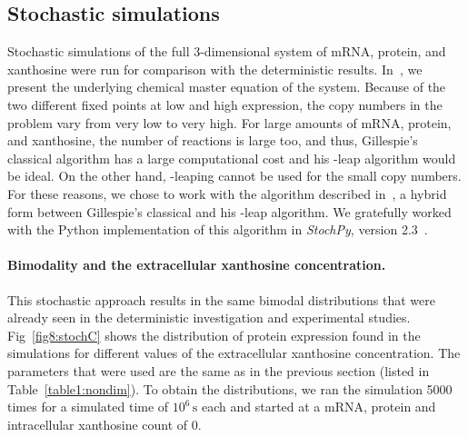 \documentclass[10pt,letterpaper]{article}
\newcommand{\unit}[1]{\,\mathrm{#1}}
\begin{document}
	\subsection*{Stochastic simulations}
	Stochastic simulations of the full 3-dimensional system of mRNA, protein,
	and xanthosine were run for comparison with the deterministic results.
	In~, we present the underlying chemical master equation of
	the system. Because of the two different fixed points at low and high
	expression, the copy numbers in the problem vary from very low to very high.
	For large amounts of mRNA, protein, and xanthosine, the number of reactions
	is large too, and thus, Gillespie's classical algorithm has a large
	computational cost and his \texttau-leap algorithm would be ideal. On the
	other hand, \texttau-leaping cannot be used for the small copy numbers. For
	these reasons, we chose to work with the algorithm described
	in~\cite{Cao2006}, a hybrid form between Gillespie's classical and his
	\texttau-leap algorithm. We gratefully worked with the Python implementation
	of this algorithm in \emph{StochPy}, version 2.3~\cite{Maarleveld2015}.
	
	\paragraph*{Bimodality and the extracellular xanthosine concentration.}
	This stochastic approach results in the same bimodal distributions that were already
	seen in the deterministic investigation and experimental studies.
	Fig~\ref{fig8:stochC} shows the distribution of protein expression found in
	the simulations for different values of the extracellular xanthosine
	concentration. The parameters that were used are the same as in the previous
	section (listed in Table~\ref{table1:nondim}). To obtain the distributions,
	we ran the simulation 5000 times for a simulated time of $10^6 \unit{s}$
	each and started at a mRNA, protein and intracellular xanthosine count of 0.
	
\end{document}
